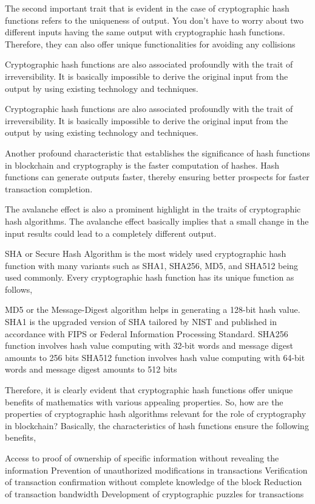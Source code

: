 \documentclass[BTech]{srmuthesis}
\begin{document}
  The second important trait that is evident in the case of cryptographic hash functions refers to the uniqueness of output. You don’t have to worry about two different inputs having the same output with cryptographic hash functions. 
  Therefore, they can also offer unique functionalities for avoiding any collisions

  Cryptographic hash functions are also associated profoundly with the trait of irreversibility. It is basically impossible to derive the original input from the output by using existing technology and techniques. 

  Cryptographic hash functions are also associated profoundly with the trait of irreversibility. It is basically impossible to derive the original input from the output by using existing technology and techniques. 

  Another profound characteristic that establishes the significance of hash functions in blockchain and cryptography is the faster computation of hashes. Hash functions can generate outputs faster, thereby ensuring better prospects for faster transaction completion. 

  The avalanche effect is also a prominent highlight in the traits of cryptographic hash algorithms. The avalanche effect basically implies that a small change in the input results could lead to a completely different output.

  SHA or Secure Hash Algorithm is the most widely used cryptographic hash function with many variants such as SHA1, SHA256, MD5, and SHA512 being used commonly. Every cryptographic hash function has its unique function as follows,

  MD5 or the Message-Digest algorithm helps in generating a 128-bit hash value. SHA1 is the upgraded version of SHA tailored by NIST and published in accordance with FIPS or Federal Information Processing Standard. SHA256 function involves hash value computing with 32-bit words and message digest amounts to 256 bits
  SHA512 function involves hash value computing with 64-bit words and message digest amounts to 512 bits

  Therefore, it is clearly evident that cryptographic hash functions offer unique benefits of mathematics with various appealing properties. So, how are the properties of cryptographic hash algorithms relevant for the role of cryptography in blockchain? Basically, the characteristics of hash functions ensure the following benefits,

  Access to proof of ownership of specific information without revealing the information
 Prevention of unauthorized modifications in transactions
 Verification of transaction confirmation without complete knowledge of the block
 Reduction of transaction bandwidth
 Development of cryptographic puzzles for transactions
\end{document}
